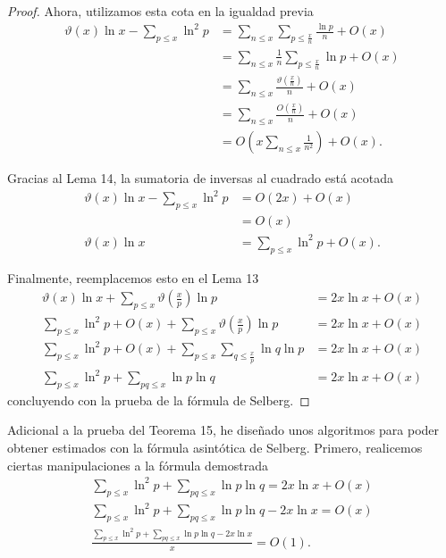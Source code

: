 \documentclass{article}
\theoremstyle{definition}
\theoremstyle{remark}
\begin{document}
\begin{proof}
Ahora, utilizamos esta cota en la igualdad previa
\begin{align*}
\vartheta(x)\ln x - \sum_{p \leq x} \ln^2 p &= \sum_{n \leq x} \sum_{p \leq \frac{x}{n}} \frac{\ln p}{n} + O(x) \\
&= \sum_{n \leq x} \frac{1}{n}\sum_{p \leq \frac{x}{n}} \ln p + O(x) \\
&= \sum_{n \leq x} \frac{\vartheta\left(\frac{x}{n}\right)}{n} + O(x) \\
&= \sum_{n \leq x} \frac{O\left(\frac{x}{n}\right)}{n} + O(x) \\
&= O\left(x \sum_{n \leq x} \frac{1}{n^2}\right) + O(x).
\end{align*}

Gracias al Lema 14, la sumatoria de inversas al cuadrado est\'a acotada
\begin{align*}
\vartheta(x)\ln x - \sum_{p \leq x} \ln^2 p &= O(2x) + O(x) \\
&= O(x)\\
\vartheta(x)\ln x &= \sum_{p \leq x} \ln^2 p + O(x).
\end{align*}

Finalmente, reemplacemos esto en el Lema 13
\begin{align*}
\vartheta(x)\ln x + \sum_{p \leq x} \vartheta\left(\frac{x}{p}\right)\ln p &= 2x\ln x + O(x) \\
\sum_{p \leq x} \ln^2 p + O(x) + \sum_{p \leq x} \vartheta\left(\frac{x}{p}\right)\ln p &= 2x\ln x + O(x) \\
\sum_{p \leq x} \ln^2 p + O(x) + \sum_{p \leq x} \sum_{q \leq \frac{x}{p}} \ln q \ln p &= 2x\ln x + O(x) \\
\sum_{p \leq x} \ln^2 p + \sum_{pq \leq x} \ln p \ln q &= 2x\ln x + O(x)
\end{align*}
concluyendo con la prueba de la f\'ormula de Selberg.
\end{proof}

\newpage

Adicional a la prueba del Teorema 15, he dise\~nado unos algoritmos para poder obtener estimados
con la f\'ormula asint\'otica de Selberg. Primero, realicemos ciertas manipulaciones a la f\'ormula demostrada
\begin{gather*}
\sum_{p \leq x} \ln^2 p + \sum_{pq \leq x} \ln p \ln q = 2x\ln x + O(x) \\
\sum_{p \leq x} \ln^2 p + \sum_{pq \leq x} \ln p \ln q - 2x\ln x = O(x) \\
\frac{\sum_{p \leq x} \ln^2 p + \sum_{pq \leq x} \ln p \ln q - 2x\ln x}{x} = O(1).
\end{gather*}
\end{document}
